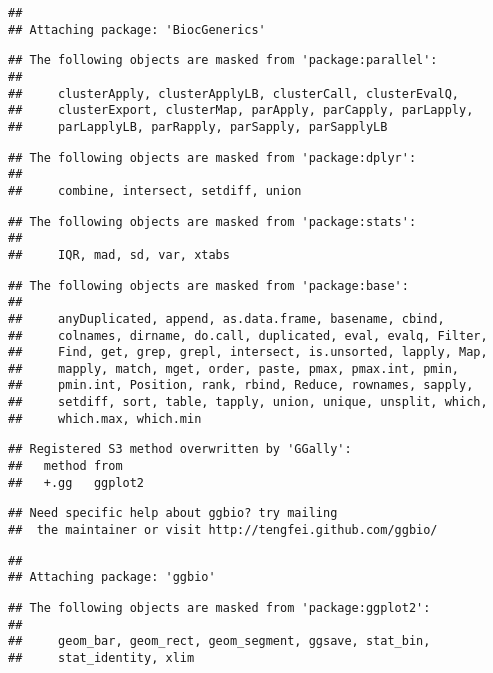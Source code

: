 \documentclass[]{article}
\begin{document}
\begin{verbatim}
## 
## Attaching package: 'BiocGenerics'
\end{verbatim}

\begin{verbatim}
## The following objects are masked from 'package:parallel':
## 
##     clusterApply, clusterApplyLB, clusterCall, clusterEvalQ,
##     clusterExport, clusterMap, parApply, parCapply, parLapply,
##     parLapplyLB, parRapply, parSapply, parSapplyLB
\end{verbatim}

\begin{verbatim}
## The following objects are masked from 'package:dplyr':
## 
##     combine, intersect, setdiff, union
\end{verbatim}

\begin{verbatim}
## The following objects are masked from 'package:stats':
## 
##     IQR, mad, sd, var, xtabs
\end{verbatim}

\begin{verbatim}
## The following objects are masked from 'package:base':
## 
##     anyDuplicated, append, as.data.frame, basename, cbind,
##     colnames, dirname, do.call, duplicated, eval, evalq, Filter,
##     Find, get, grep, grepl, intersect, is.unsorted, lapply, Map,
##     mapply, match, mget, order, paste, pmax, pmax.int, pmin,
##     pmin.int, Position, rank, rbind, Reduce, rownames, sapply,
##     setdiff, sort, table, tapply, union, unique, unsplit, which,
##     which.max, which.min
\end{verbatim}

\begin{verbatim}
## Registered S3 method overwritten by 'GGally':
##   method from   
##   +.gg   ggplot2
\end{verbatim}

\begin{verbatim}
## Need specific help about ggbio? try mailing 
##  the maintainer or visit http://tengfei.github.com/ggbio/
\end{verbatim}

\begin{verbatim}
## 
## Attaching package: 'ggbio'
\end{verbatim}

\begin{verbatim}
## The following objects are masked from 'package:ggplot2':
## 
##     geom_bar, geom_rect, geom_segment, ggsave, stat_bin,
##     stat_identity, xlim
\end{verbatim}
\end{document}
